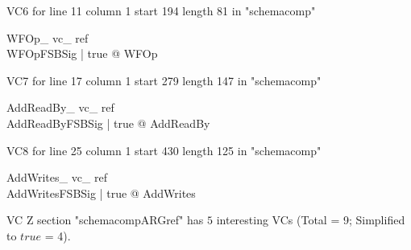 \documentclass{article}
\begin{document}
VC6 for line 11 column 1 start 194 length 81 in "schemacomp"
\begin{theorem}{ WFOp\_ vc\_ ref}\\
 \forall WFOpFSBSig | true @ \pre WFOp \\

\end{theorem}

VC7 for line 17 column 1 start 279 length 147 in "schemacomp"
\begin{theorem}{ AddReadBy\_ vc\_ ref}\\
 \forall AddReadByFSBSig | true @ \pre AddReadBy \\

\end{theorem}

VC8 for line 25 column 1 start 430 length 125 in "schemacomp"
\begin{theorem}{ AddWrites\_ vc\_ ref}\\
 \forall AddWritesFSBSig | true @ \pre AddWrites \\

\end{theorem}



 VC Z section "schemacompARGref" has $5$ interesting VCs (Total = 9; Simplified to $true$ = 4).



\end{document}
